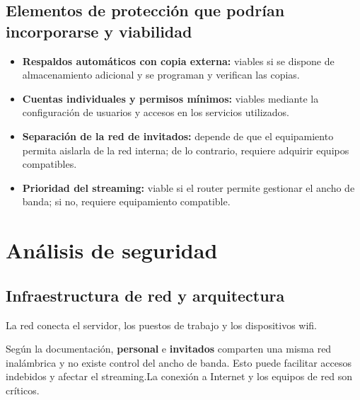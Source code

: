 \documentclass[12pt,a4paper]{article}
\begin{document}
\subsection*{Elementos de protección que podrían incorporarse y viabilidad}
\begin{itemize}
    \item \textbf{Respaldos automáticos con copia externa:} viables si se dispone de almacenamiento adicional y se programan y verifican las copias.
    \item \textbf{Cuentas individuales y permisos mínimos:} viables mediante la configuración de usuarios y accesos en los servicios utilizados.
    \item \textbf{Separación de la red de invitados:} depende de que el equipamiento permita aislarla de la red interna; de lo contrario, requiere adquirir equipos compatibles.
    \item \textbf{Prioridad del streaming:} viable si el router permite gestionar el ancho de banda; si no, requiere equipamiento compatible.
\end{itemize}

\clearpage
\section{Análisis de seguridad}
\subsection{Infraestructura de red y arquitectura}
La red conecta el servidor, los puestos de trabajo y los dispositivos wifi. 

Según la documentación, \textbf{personal} e \textbf{invitados} comparten una misma red inalámbrica y no existe control del ancho de banda. Esto puede facilitar accesos indebidos y afectar el streaming.La conexión a Internet y los equipos de red son críticos.
\end{document}
